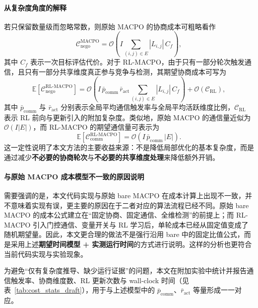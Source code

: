\documentclass[12pt]{ctexart}
\begin{document}
\paragraph{从复杂度角度的解释}
若只保留数量级而忽略常数，则原始 MACPO 的协商成本可粗略看作
\[
\mathcal{C}_{\mathrm{nego}}^{\mathrm{MACPO}}
=
\mathcal{O}\!\left(
I\sum_{(i,j)\in E}|L_{i,j}|\,C_f
\right),
\]
其中 $C_f$ 表示一次目标评估代价。对于 RL-MACPO，由于只有一部分轮次触发通信，且只有一部分共享维度真正参与竞争与检测，其期望协商成本可写为
\[
\mathbb{E}\!\left[\mathcal{C}_{\mathrm{nego}}^{\mathrm{RL\mbox{-}MACPO}}\right]
=
\mathcal{O}\!\left(
I\,\bar p_{\mathrm{comm}}\,\bar r_{\mathrm{act}}
\sum_{(i,j)\in E}|L_{i,j}|\,C_f
\right)
+ 
\mathcal{O}(\mathcal{C}_{\mathrm{RL}}),
\]
其中 $\bar p_{\mathrm{comm}}$ 与 $\bar r_{\mathrm{act}}$ 分别表示全局平均通信触发率与全局平均活跃维度比例，$\mathcal{C}_{\mathrm{RL}}$ 表示 RL 前向与更新引入的附加复杂度。类似地，原始 MACPO 的通信量近似为 $\mathcal{O}(I|E|)$，而 RL-MACPO 的期望通信量可表示为
\[
\mathbb{E}[\mathcal{C}_{\mathrm{comm}}^{\mathrm{RL\mbox{-}MACPO}}]
=
\mathcal{O}(I\,\bar p_{\mathrm{comm}}\,|E|).
\]
这一定性说明了本文方法的主要收益来源：不是降低局部优化的基本复杂度，而是通过减少\textbf{不必要的协商轮次}与\textbf{不必要的共享维度处理}来降低额外开销。

\paragraph{与原始 MACPO 成本模型不一致的原因说明}
需要强调的是，本文代码实现与原始 bare MACPO 在成本计算上出现不一致，并不意味着实现有误，更主要的原因在于二者对应的算法流程已经不同。原始 bare MACPO 的成本公式建立在“固定协商、固定通信、全维检测”的前提上；而 RL-MACPO 引入门控通信、变量开关与 RL 学习后，单轮成本已经从固定值变成了随机期望量。因此，本文更合理的做法不是强行沿用 bare 中的固定比值公式，而是采用上述\textbf{期望时间模型 + 实测运行时间}的方式进行说明。这样的分析也更符合当前代码实现与实验现象。

为避免“仅有复杂度推导、缺少运行证据”的问题，本文在附加实验中统计并报告通信触发率、协商维度数、RL 更新次数与 wall-clock 时间（见表~\ref{tab:cost_stats_draft}），用于与上述模型中的 \(\bar p_{\mathrm{comm}}\)、\(\bar r_{\mathrm{act}}\) 等量形成一一对应。
\end{document}
